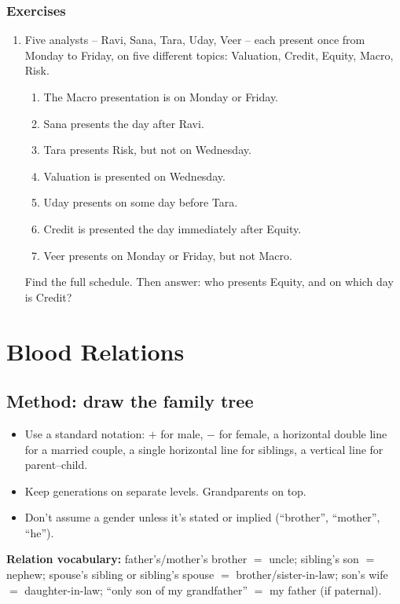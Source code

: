 \documentclass[11pt,a4paper,openany]{report}
\newenvironment{exercises}{\subsection*{Exercises \thechapter}\begin{enumerate}[label=\textbf{\thechapter.\arabic*},leftmargin=3.2em]}{\end{enumerate}}
\begin{document}
\begin{exercises}
\item Five analysts -- Ravi, Sana, Tara, Uday, Veer -- each present once from Monday to Friday, on five different topics: Valuation, Credit, Equity, Macro, Risk.
\begin{enumerate}[nosep,label=(\roman*)]
\item The Macro presentation is on Monday or Friday.
\item Sana presents the day after Ravi.
\item Tara presents Risk, but not on Wednesday.
\item Valuation is presented on Wednesday.
\item Uday presents on some day before Tara.
\item Credit is presented the day immediately after Equity.
\item Veer presents on Monday or Friday, but not Macro.
\end{enumerate}
Find the full schedule. Then answer: who presents Equity, and on which day is Credit?
\end{exercises}

\chapter{Blood Relations}\label{ch:blood}

\section{Method: draw the family tree}
\begin{itemize}[nosep]
\item Use a standard notation: $+$ for male, $-$ for female, a horizontal double line for a married couple, a single horizontal line for siblings, a vertical line for parent--child.
\item Keep generations on separate levels. Grandparents on top.
\item Don't assume a gender unless it's stated or implied (``brother'', ``mother'', ``he'').
\end{itemize}

\textbf{Relation vocabulary:} father's/mother's brother $=$ uncle; sibling's son $=$ nephew; spouse's sibling or sibling's spouse $=$ brother/sister-in-law;
son's wife $=$ daughter-in-law; ``only son of my grandfather'' $=$ my father (if paternal).
\end{document}

